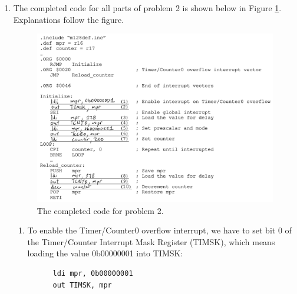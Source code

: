 \documentclass[11pt]{article}
\begin{document}
\begin{enumerate}[leftmargin=0.2in]
\begin{enumerate}
    \item To clear latched interrupts at the end of \texttt{ISR\_DevA}, we have to clear the corresponding bits in the External Interrupt Flag Register (EIFR). To clear a bit in that register, we write a 1 to the bit. There are three interrupts enabled, so three possible latched interrupts. To clear any latched interrupts on INT2, INT5, or INT6, we write 0b01100100 to EIFR:
      \begin{verbatim}
      ldi mpr, 0b01100100
      out EIFR, mpr
      \end{verbatim}

    \item No because there are conflicting instructions at the memory address 0x000E. Each interrupt vector has only two memory words (32 bits) of space. The \texttt{CALL} instruction itself is 32 bits long, so the \texttt{RETI} instruction would be stored at the address 0x000E. The problem is that the \texttt{RJMP ISR\_DevC} instruction is also placed at address 0x000E, so there is a conflict that should be caught by the assembler.

      Otherwise, if there were not a conflicting instruction at memory address 0x000E, this program would function correctly because after the \texttt{ISR\_DevB} function returns, it would execute the \texttt{RETI} instruction and return to where the program was executing before the interrupt, as expected.
  \end{enumerate}

\item The completed code for all parts of problem 2 is shown below in Figure \ref{fig:p2}. Explanations follow the figure.

  \begin{figure}[H]
    \centering
    \includegraphics[width=0.5\linewidth]{p2.png}
    \caption{The completed code for problem 2.}
    \label{fig:p2}
  \end{figure}

  \begin{enumerate}
    \item To enable the Timer/Counter0 overflow interrupt, we have to set bit 0 of the Timer/Counter Interrupt Mask Register (TIMSK), which means loading the value 0b00000001 into TIMSK:
      \begin{verbatim}
      ldi mpr, 0b00000001
      out TIMSK, mpr
      \end{verbatim}


\end{enumerate}
\end{enumerate}
\end{document}
